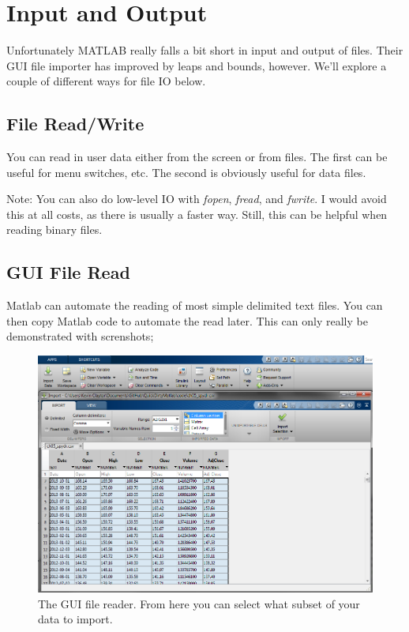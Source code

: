 
\pagebreak
\section{Input and Output}
Unfortunately MATLAB really falls a bit short in input and output of files.
 Their GUI file importer has improved by leaps and bounds, however.
 We'll explore a couple of different ways for file IO below.

\subsection{File Read/Write}
You can read in user data either from the screen or from files.
 The first can be useful for menu switches, etc.
 The second is obviously useful for data files.

\begin{quote}

\end{quote}

Note: You can also do low-level IO with \emph{fopen}, \emph{fread}, and \emph{fwrite}.
 I would avoid this at all costs, as there is usually a faster way.
 Still, this can be helpful when reading binary files.

\pagebreak
\subsection{GUI File Read}
Matlab can automate the reading of most simple delimited text files.
 You can then copy Matlab code to automate the read later.
 This can only really be demonstrated with screnshots;

\begin{figure}[ht!]
\centering
\includegraphics[width=120mm]{img/guiload.png}
\caption{The GUI file reader. From here you can select what subset of your data to import.}
\label{guiload}
\end{figure}


